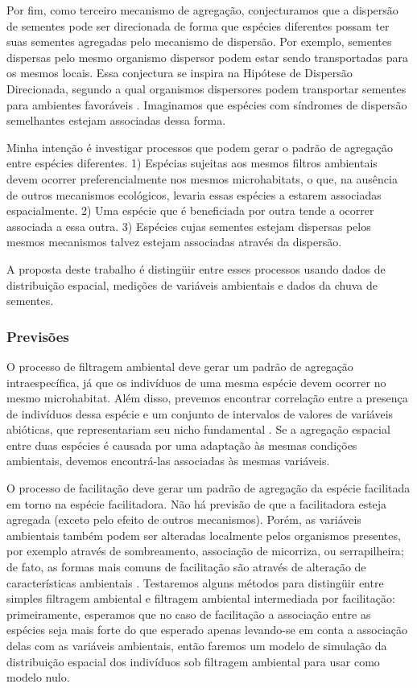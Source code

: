 \documentclass[twoside,12pt,a4paper]{report}
\begin{document}
Por fim, como terceiro mecanismo de agregação, conjecturamos que a dispersão de sementes pode ser
direcionada de forma que espécies diferentes possam ter suas sementes agregadas pelo mecanismo de
dispersão. Por exemplo, sementes dispersas pelo mesmo organismo dispersor podem estar sendo
transportadas para os mesmos locais. Essa conjectura se inspira na Hipótese de Dispersão
Direcionada, segundo a qual organismos dispersores podem transportar sementes para ambientes
favoráveis \citep{Wenny2001, TODO,morerefs}. Imaginamos que espécies com síndromes de dispersão
semelhantes estejam associadas dessa forma.

Minha intenção é investigar processos que podem gerar o padrão de agregação entre espécies
diferentes. 1) Espécias sujeitas aos mesmos filtros ambientais devem ocorrer preferencialmente
nos mesmos microhabitats, o que, na ausência de outros mecanismos ecológicos, levaria essas
espécies a estarem associadas espacialmente. 2) Uma espécie que é beneficiada por outra tende a
ocorrer associada a essa outra. 3) Espécies cujas sementes estejam dispersas pelos mesmos
mecanismos talvez estejam associadas através da dispersão.

A proposta deste trabalho é distingüir entre esses processos usando dados de distribuição espacial, medições de variáveis ambientais e dados da chuva de sementes.

\subsubsection{Previsões}

O processo de filtragem ambiental deve gerar um padrão de agregação intraespecífica, já que os
indivíduos de uma mesma espécie devem ocorrer no mesmo microhabitat. Além disso, prevemos encontrar
correlação entre a presença de indivíduos dessa espécie e um conjunto de intervalos de valores de
variáveis abióticas, que representariam seu nicho fundamental \citep{Hutchinson1957}. Se a
agregação espacial entre duas espécies é causada por uma adaptação às mesmas condições ambientais,
devemos encontrá-las associadas às mesmas variáveis.

O processo de facilitação deve gerar um padrão de agregação da espécie facilitada em torno na
espécie facilitadora. Não há previsão de que a facilitadora esteja agregada (exceto pelo efeito de
outros mecanismos). Porém, as variáveis ambientais também podem ser alteradas localmente pelos
organismos presentes, por exemplo através de sombreamento, associação de micorriza, ou
serrapilheira; de fato, as formas mais comuns de facilitação são através de alteração de
características ambientais \citep{TODO,refs}. Testaremos alguns métodos para distingüir entre simples
filtragem ambiental e filtragem ambiental intermediada por facilitação: primeiramente, esperamos que
no caso de facilitação a associação entre as espécies seja mais forte do que esperado apenas
levando-se em conta a associação delas com as variáveis ambientais, então faremos um modelo de
simulação da distribuição espacial dos indivíduos sob filtragem ambiental para usar como modelo
nulo.
\end{document}
